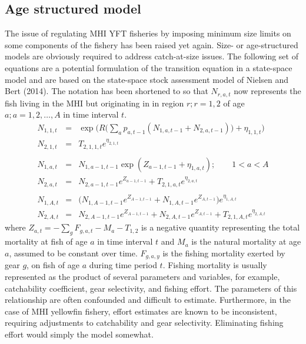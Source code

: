 \documentclass[12pt,letterpaper]{article}
\begin{document}
\subsection*{Age structured model}
\newcommand{\NNone}[2]{N_{1,#1,#2}}
\newcommand{\NNtwo}[2]{N_{2,#1,#2}}
The issue of regulating MHI YFT fisheries by imposing minimum size
limits on some components of the fishery has been raised yet again.
Size- or age-structured models are obviously required to address catch-at-size
issues. The following set of equations are a potential formulation
of the transition equation in a state-space model and are based on the
state-space stock assessment model of Nielsen and Bert (2014). The notation has
been shortened to so that $N_{r,a,t}$ now represents the fish living
in the MHI but originating in in region $r; r = 1,2$ of age $a; a =
1, 2, \ldots, A$ in time interval $t$.
\begin{eqnarray}
\NNone{1}{t}&=&\exp\Big(R\big(\sum_a{p_{a,t-1}(\NNone{a}{t-1}+\NNtwo{a}{t-1})}\big)+\eta_{1,1,t}\Big)\\
\NNtwo{1}{t}&=&T_{2,1,1,t}e^{\eta_{2,1,t}}\\
\nonumber\\
\NNone{a}{t}&=&\NNone{a-1}{t-1}\exp(Z_{a-1,t-1}+\eta_{1,a,t});\qquad 1<a<A \\
\NNtwo{a}{t}&=&\NNtwo{a-1}{t-1}e^{Z_{a-1,t-1}}+T_{2,1,a,t}e^{\eta_{2,a,t}}\\
\nonumber\\
\NNone{A}{t}&=&\Big(\NNone{A-1}{t-1}e^{Z_{A-1,t-1}}+\NNone{A}{t-1}e^{Z_{A,t-1}}\Big)e^{\eta_{1,A,t}}\\
\NNtwo{A}{t}&=&\NNtwo{A-1}{t-1}e^{Z_{A-1,t-1}}+\NNtwo{A}{t-1}e^{Z_{A,t-1}}+T_{2,1,A,t}e^{\eta_{2,A,t}} 
\end{eqnarray}
where $Z_{a,t} = -\sum_gF_{g,a,t} - M_{a} - T_{1,2}$ is a negative quantity
representing the total mortality at fish of age $a$ in time interval
$t$ and
$M_{a}$ is the natural mortality at age $a$, assumed to be constant
over time. 
$F_{g,a,y}$ is the fishing mortality exerted by gear $g$, on fish of
age $a$ during time period $t$. Fishing mortality is usually
represented as the product of several parameters and variables, for
example, catchability coefficient, gear selectivity, and fishing
effort. The parameters of this relationship are often confounded and
difficult to estimate. Furthermore, in the case of MHI yellowfin
fishery, effort estimates are known to be inconsistent, requiring
adjustments to catchability and gear selectivity. Eliminating 
fishing effort would simply the model somewhat.
\end{document}
